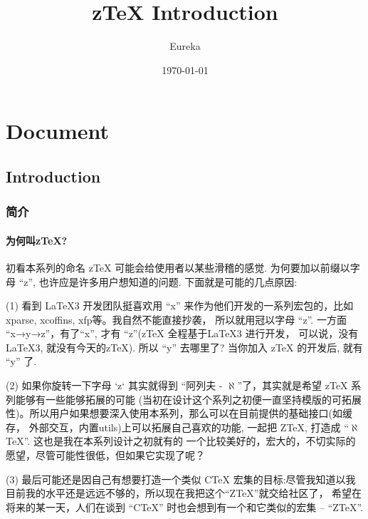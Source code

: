 \documentclass[
  hyper,    
  lang=cn,
  class=book,
  mathSpec={envStyle=leftbar, alias},
  toc={redef}
]{zlatex}
\title{z\TeX{} Introduction}
\author{Eureka}
\date{\today}
\let\cmd\zlatexVerb
\begin{document}
\maketitle
\frontmatter
\tableofcontents
\mainmatter
\part{Document}
\chapter{Introduction}
\section{简介}
\subsection{为何叫z\TeX{}?}


初看本系列的命名 z\TeX{} 可能会给使用者以某些滑稽的感觉. 为何要加以前缀以字母 ``z'', 也许应是许多用户想知道的问题.
下面就是可能的几点原因:

(1) 看到 \LaTeX3 开发团队挺喜欢用 ``x'' 来作为他们开发的一系列宏包的，比如 xparse, xcoffins, xfp等。我自然不能直接抄袭，
所以就用冠以字母 ``z''. 一方面 ``x→y→z''，有了``x'', 才有 ``z''(z\TeX{} 全程基于\LaTeX3 进行开发，
可以说，没有\LaTeX3, 就没有今天的z\TeX{}). 所以 ``y'' 去哪里了? 当你加入 z\TeX{} 的开发后, 就有 ``y'' 了.

(2) 如果你旋转一下字母 `z` 其实就得到 ``阿列夫 - $\aleph$''了，其实就是希望 z\TeX{} 系列能够有一些能够拓展的可能
(当初在设计这个系列之初便一直坚持模版的可拓展性)。所以用户如果想要深入使用本系列，那么可以在目前提供的基础接口(如缓存，
外部交互，内置utils)上可以拓展自己喜欢的功能, 一起把 Z\TeX{}, 打造成 ``$\aleph$ TeX''. 这也是我在本系列设计之初就有的
一个比较美好的，宏大的，不切实际的愿望，尽管可能性很低，但如果它实现了呢？ 

(3) 最后可能还是因自己有想要打造一个类似 C\TeX{} 宏集的目标:尽管我知道以我目前我的水平还是远远不够的，所以现在我把这个``Z\TeX{}''就交给社区了，
希望在将来的某一天，人们在谈到 ``C\TeX'' 时也会想到有一个和它类似的宏集 -- ``Z\TeX{}''.
\end{document}
